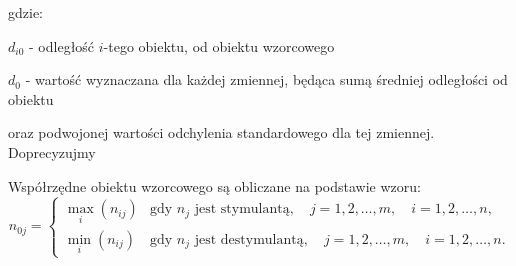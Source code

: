 \documentclass[12pt,a4paper]{report}
\begin{document}
gdzie:

$d_{i0}$ - odległość $i$-tego obiektu, od obiektu wzorcowego

$d_{0}$ - wartość wyznaczana dla każdej zmiennej, będąca sumą średniej odległości od obiektu

 oraz podwojonej wartości odchylenia standardowego dla tej zmiennej. Doprecyzujmy

Współrzędne obiektu wzorcowego są obliczane na podstawie wzoru:
$$n_{0j}=\left\{ \begin{array}{ll}
\max\limits_{i} (n_{ij}) & \textrm{gdy } n_{j} \textrm{ jest stymulantą},\quad j=1,2,\dots,m, \quad i=1,2,\dots,n, \\
\min\limits_{i} (n_{ij}) & \textrm{gdy } n_{j} \textrm{ jest destymulantą}, \quad j=1,2,\dots,m, \quad i=1,2,\dots,n.
\end{array} \right. $$
\end{document}
